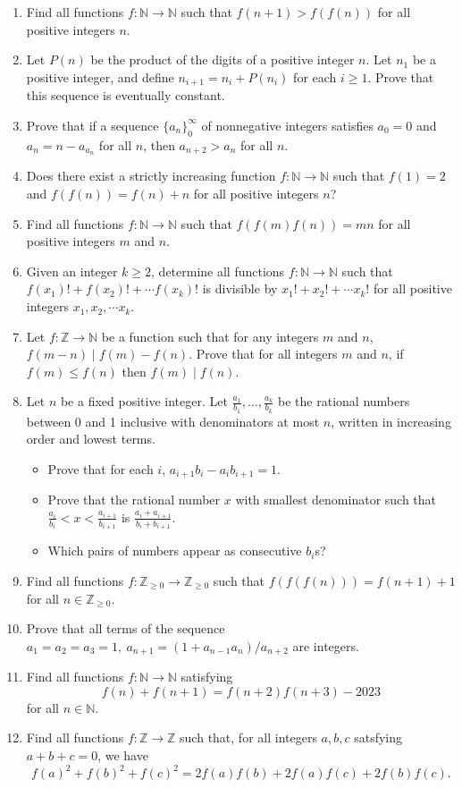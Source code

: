 \documentclass{article}
\newcommand\Nn{\mathbb{N}}
\newcommand\Zz{\mathbb{Z}}
\begin{document}
\begin{enumerate}
  \item Find all functions $f:\Nn\to\Nn$ such that $f(n+1)>f(f(n))$ for all
    positive integers $n$.
  \item Let $P(n)$ be the product of the digits of a positive integer $n$.
    Let $n_1$ be a positive integer, and define $n_{i+1}=n_i+P(n_i)$ for each
    $i\ge 1$. Prove that this sequence is eventually constant.
  \item Prove that if a sequence $\{a_n\}_0^\infty$ of nonnegative integers satisfies
    $a_0=0$ and $a_n=n-a_{a_n}$ for all $n$, then $a_{n+2}>a_n$ for all $n$.
  \item Does there exist a strictly increasing function $f:\Nn\to\Nn$ such that
    $f(1)=2$ and $f(f(n))=f(n)+n$ for all positive integers $n$?
  \item Find all functions $f:\Nn\to\Nn$ such that $f(f(m)f(n))=mn$ for all
    positive integers $m$ and $n$.
  \item Given an integer $k\geq 2$, determine all functions $f:\Nn\to\Nn$
    such that $f(x_1)!+f(x_2)!+\cdots f(x_k)!$
    is divisible by $x_1!+x_2!+\cdots x_k!$ for all positive integers
    $x_1,x_2,\cdots x_k$.
  \item Let $f:\Zz\to\Nn$ be a function such that for any integers $m$ and $n$,
    $f(m-n)\mid f(m)-f(n)$. Prove that for all integers $m$ and $n$, if $f(m)\le
    f(n)$ then $f(m)\mid f(n)$.
  \item Let $n$ be a fixed positive integer. Let
    $\frac{a_1}{b_1},\ldots,\frac{a_k}{b_k}$ be the rational numbers between 0
    and 1 inclusive with denominators at most $n$, written in increasing order
    and lowest terms.
    \begin{itemize}
      \item Prove that for each $i$, $a_{i+1}b_i-a_i b_{i+1}=1$.
      \item Prove that the rational number $x$ with smallest denominator such
        that $\frac{a_i}{b_i}<x<\frac{a_{i+1}}{b_{i+1}}$ is
        $\frac{a_i+a_{i+1}}{b_i+b_{i+1}}$. 
      \item Which pairs of numbers appear as consecutive $b_i$s?
    \end{itemize}
  \item Find all functions $f:\Zz_{\ge 0}\to \Zz_{\ge 0}$ such that
    $f(f(f(n)))=f(n+1)+1$ for all $n\in\Zz_{\ge 0}$.
  \item Prove that all terms of the sequence $a_1=a_2=a_3=1,\
    a_{n+1}=(1+a_{n-1}a_n)/a_{n+2}$ are integers.
  \item Find all functions $f:\mathbb N\to\mathbb N$ satisfying 
    \[f(n)+f(n+1)=f(n+2)f(n+3)-2023\]
    for all $n\in\mathbb N$.
  \item Find all functions $f:\Zz\to\Zz$ such that, for all integers $a,b,c$
    satsfying $a+b+c=0$, we have
    \[f(a)^2+f(b)^2+f(c)^2=2f(a)f(b)+2f(a)f(c)+2f(b)f(c).\]
\end{enumerate}
\newpage
\end{document}
